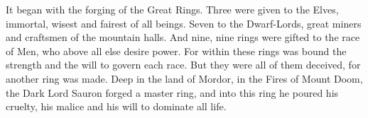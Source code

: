 It began with the forging of the Great Rings. Three were given to the Elves, immortal, wisest and fairest of all beings. Seven to the Dwarf-Lords, great miners and craftsmen of the mountain halls. And nine, nine rings were gifted to the race of Men, who above all else desire power. For within these rings was bound the strength and the will to govern each race. But they were all of them deceived, for another ring was made. Deep in the land of Mordor, in the Fires of Mount Doom, the Dark Lord Sauron forged a master ring, and into this ring he poured his cruelty, his malice and his will to dominate all life.